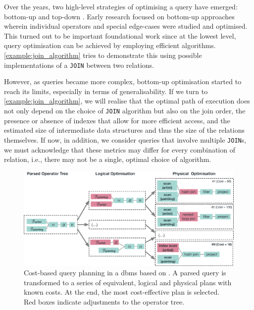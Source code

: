 Over the years, two high-level strategies of optimising a query have emerged: bottom-up and top-down \cite{Jarke:1984Query}. Early research focused on bottom-up approaches wherein individual operators and special edge-cases were studied and optimised. This turned out to be important foundational work since at the lowest level, query optimisation can be achieved by employing efficient algorithms. \cref{example:join_algorithm} tries to demonstrate this using possible implementations of a \texttt{JOIN} between two relations.

However, as queries became more complex, bottom-up optimisation started to reach its limits, especially in terms of generalisability. If we turn to \cref{example:join_algorithm}, we will realise that the optimal path of execution does not only depend on the choice of \texttt{JOIN} algorithm but also on the join order, the presence or absence of indexes that allow for more efficient access, and the estimated size of intermediate data structures and thus the size of the relations themselves. If now, in addition, we consider queries that involve multiple \texttt{JOIN}s, we must acknowledge that these metrics may differ for every combination of relation, i.e., there may not be a single, optimal choice of algorithm. 

\begin{figure}[tb]
    \centering
    \includegraphics[width=\textwidth]{figures/query-planning.eps}
    \caption{Cost-based query planning in a \acrshort{dbms} based on . A parsed query is transformed to a series of equivalent, logical and physical plans with known costs. At the end, the most cost-effective plan is selected. Red boxes indicate adjustments to the operator tree.}
    \label{figure:query_planning}
\end{figure}

